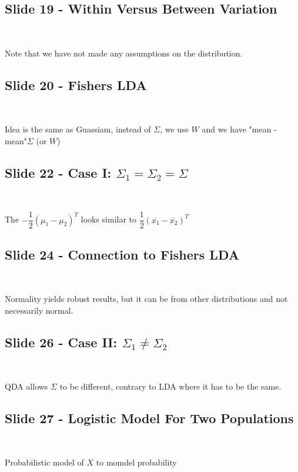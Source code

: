 \subsection{Slide 19 - Within Versus Between Variation}\hfill\\\par
\noindent Note that we have not made any assumptions on the distribution.
\par\bigskip
\subsection{Slide 20 - Fishers LDA}\hfill\\\par
\noindent Idea is the same as Guassiam, instead of $\Sigma$, we use $W$ and we have "mean - mean"$\Sigma$ (or $W$)
\par\bigskip
\subsection{Slide 22 - Case I: $\Sigma_1 = \Sigma_2 = \Sigma$}\hfill\\\par
\noindent The $-\dfrac{1}{2}(\mu_1-\mu_2)^T$ looks similar to $\dfrac{1}{2}(\overline{x_1}-\overline{x_2})^T$
\par\bigskip
\subsection{Slide 24 - Connection to Fishers LDA}\hfill\\\par
\noindent Normality yields robust results, but it can be from other distributions and not necessarily normal.
\par\bigskip
\subsection{Slide 26 - Case II: $\Sigma_1\neq\Sigma_2$}\hfill\\\par
\noindent QDA allows $\Sigma$ to be different, contrary to LDA where it has to be the same.
\par\bigskip
\subsection{Slide 27 - Logistic Model For Two Populations}\hfill\\\par
\noindent Probabilistic model of $X$ to momdel probability
\par\bigskip
